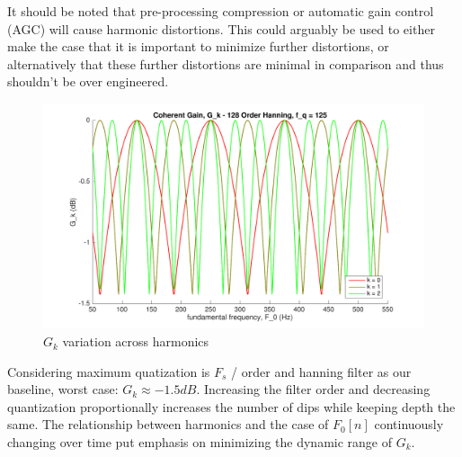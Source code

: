 \documentclass [11pt, proquest,oneside] {uwthesis}[2015/03/03]
\begin{document}
It should be noted that pre-processing compression or automatic gain control (AGC) will cause harmonic distortions.  This could arguably be used to either make the case that it is important to minimize further distortions, or alternatively that these further distortions are minimal in comparison and thus shouldn't be over engineered.

\begin{figure}[!ht]
  \centering
    \includegraphics[width=1\textwidth]{g_k_4}   
    \caption{$G_k$ variation across harmonics}\label{fig:g_k_4}
\end{figure}

Considering maximum quatization is $F_s$ / order and hanning filter as our baseline, worst case: $G_k \approx -1.5dB$.  Increasing the filter order and decreasing quantization proportionally increases the number of dips while keeping depth the same.  The relationship between harmonics and the case of $F_0[n]$ continuously changing over time put emphasis on minimizing the dynamic range of $G_k$.




\end{document}
